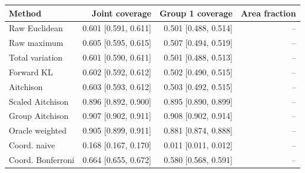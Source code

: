 \begin{tabular}{lrrr}
\toprule
Method & Joint coverage & Group 1 coverage & Area fraction \\
\midrule
Raw Euclidean & 0.601 [0.591, 0.611] & 0.501 [0.488, 0.514] & -- \\
Raw maximum & 0.605 [0.595, 0.615] & 0.507 [0.494, 0.519] & -- \\
Total variation & 0.601 [0.590, 0.611] & 0.501 [0.488, 0.513] & -- \\
Forward KL & 0.602 [0.592, 0.612] & 0.502 [0.490, 0.515] & -- \\
Aitchison & 0.603 [0.593, 0.612] & 0.503 [0.492, 0.515] & -- \\
Scaled Aitchison & 0.896 [0.892, 0.900] & 0.895 [0.890, 0.899] & -- \\
Group Aitchison & 0.907 [0.902, 0.911] & 0.908 [0.902, 0.914] & -- \\
Oracle weighted & 0.905 [0.899, 0.911] & 0.881 [0.874, 0.888] & -- \\
Coord. naive & 0.168 [0.167, 0.170] & 0.011 [0.011, 0.012] & -- \\
Coord. Bonferroni & 0.664 [0.655, 0.672] & 0.580 [0.568, 0.591] & -- \\
\bottomrule
\end{tabular}
